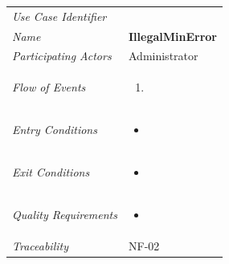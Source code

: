 \documentclass[12pt,letterpaper]{article}
\begin{document}
\begin{center}
	\begin{tabu} to 
		\toprule
		Use Case Identifier & \illegalminerror{} \\
		Name & {\bf IllegalMinError} \\
		Participating Actors & Administrator \\
		Flow of Events & 
	    \begin{enumerate}[topsep=-1em,leftmargin=*]
		    \item 
		\end{enumerate} \\

		Entry Conditions &
		\begin{itemize}[topsep=-1em,leftmargin=*]
		    \item 
        \end{itemize} \\

		Exit Conditions &
		\begin{itemize}[topsep=-1em,leftmargin=*]
		    \item 
        \end{itemize} \\

		Quality Requirements &
		\begin{itemize}[topsep=-1em,leftmargin=*]
		    \item 
        \end{itemize} \\

		Traceability & NF-02 \\
		\toprule
	\end{tabu}
\end{center}
\end{document}
